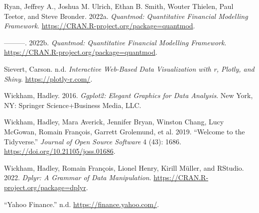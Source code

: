 \documentclass[
]{article}
\newlength{\cslhangindent}
\newlength{\cslentryspacingunit} %
\newenvironment{CSLReferences}[2] %
 {%
  \setlength{\parindent}{0pt}
  \ifodd #1
  \let\oldpar\par
  \def\par{\hangindent=\cslhangindent\oldpar}
  \fi
  \setlength{\parskip}{#2\cslentryspacingunit}
 }%
 {}
\begin{document}
\begin{CSLReferences}{1}{0}
\leavevmode{}%
Ryan, Jeffrey A., Joshua M. Ulrich, Ethan B. Smith, Wouter Thielen, Paul
Teetor, and Steve Bronder. 2022a. \emph{Quantmod: Quantitative Financial
Modelling Framework}. \url{https://CRAN.R-project.org/package=quantmod}.

\leavevmode{}%
---------. 2022b. \emph{Quantmod: Quantitative Financial Modelling
Framework}. \url{https://CRAN.R-project.org/package=quantmod}.

\leavevmode{}%
Sievert, Carson. n.d. \emph{Interactive Web-Based Data Visualization
with r, Plotly, and Shiny}. \url{https://plotly-r.com/}.

\leavevmode{}%
Wickham, Hadley. 2016. \emph{Ggplot2: Elegant Graphics for Data
Analysis}. New York, NY: Springer Science+Business Media, LLC.

\leavevmode{}%
Wickham, Hadley, Mara Averick, Jennifer Bryan, Winston Chang, Lucy
McGowan, Romain François, Garrett Grolemund, et al. 2019. {``Welcome to
the Tidyverse.''} \emph{Journal of Open Source Software} 4 (43): 1686.
\url{https://doi.org/10.21105/joss.01686}.

\leavevmode{}%
Wickham, Hadley, Romain François, Lionel Henry, Kirill Müller, and
RStudio. 2022. \emph{Dplyr: A Grammar of Data Manipulation}.
\url{https://CRAN.R-project.org/package=dplyr}.

\leavevmode{}%
{``Yahoo Finance.''} n.d. \url{https://finance.yahoo.com/}.

\end{CSLReferences}
\end{document}
